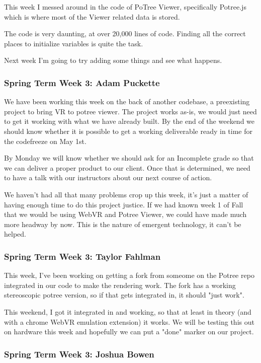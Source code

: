 \documentclass[draftclsnofoot,onecolumn]{IEEEtran}
\begin{document}
This week I messed around in the code of PoTree Viewer, specifically Potree.js which is where most of the Viewer related data is stored.

The code is very daunting, at over 20,000 lines of code. Finding all the correct places to initialize variables is quite the task.

Next week I'm going to try adding some things and see what happens.

\subsubsection{Spring Term Week 3: Adam Puckette}

We have been working this week on the back of another codebase, a preexisting project to bring VR to potree viewer. The project works as-is, we would just need to get it working with what we have already built. By the end of the weekend we should know whether it is possible to get a working deliverable ready in time for the codefreeze on May 1st.

By Monday we will know whether we should ask for an Incomplete grade so that we can deliver a proper product to our client. Once that is determined, we need to have a talk with our instructors about our next course of action.

We haven't had all that many problems crop up this week, it's just a matter of having enough time to do this project justice. If we had known week 1 of Fall that we would be using WebVR and Potree Viewer, we could have made much more headway by now. This is the nature of emergent technology, it can't be helped.

\subsubsection{Spring Term Week 3: Taylor Fahlman}

This week, I've been working on getting a fork from someome on the Potree repo integrated in our code to make the rendering work. The fork has a working stereoscopic potree version, so if that gets integrated in, it should "just work".

This weekend, I got it integrated in and working, so that at least in theory (and with a chrome WebVR emulation extension) it works. We will be testing this out on hardware this week and hopefully we can put a "done" marker on our project.

\subsubsection{Spring Term Week 3: Joshua Bowen}
\end{document}
